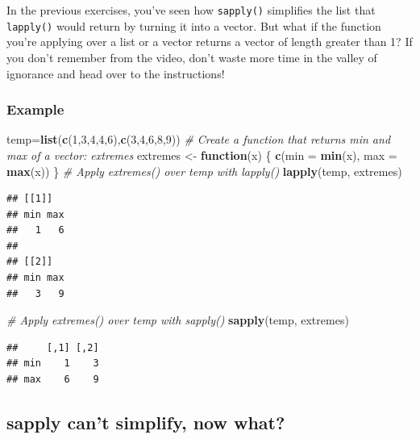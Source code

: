 \documentclass[
]{book}
\newenvironment{Shaded}{\begin{snugshade}}{\end{snugshade}}
\newcommand{\CommentTok}[1]{\textcolor[rgb]{0.56,0.35,0.01}{\textit{#1}}}
\newcommand{\ControlFlowTok}[1]{\textcolor[rgb]{0.13,0.29,0.53}{\textbf{#1}}}
\newcommand{\DataTypeTok}[1]{\textcolor[rgb]{0.13,0.29,0.53}{#1}}
\newcommand{\DecValTok}[1]{\textcolor[rgb]{0.00,0.00,0.81}{#1}}
\newcommand{\KeywordTok}[1]{\textcolor[rgb]{0.13,0.29,0.53}{\textbf{#1}}}
\newcommand{\NormalTok}[1]{#1}
\newcommand{\StringTok}[1]{\textcolor[rgb]{0.31,0.60,0.02}{#1}}
\begin{document}
In the previous exercises, you've seen how \texttt{sapply()} simplifies the list that \texttt{lapply()} would return by turning it into a vector. But what if the function you're applying over a list or a vector returns a vector of length greater than 1? If you don't remember from the video, don't waste more time in the valley of ignorance and head over to the instructions!

\hypertarget{example-4}{%
\subsubsection{Example}\label{example-4}}

\begin{Shaded}
\begin{Highlighting}[]
\NormalTok{temp=}\KeywordTok{list}\NormalTok{(}\KeywordTok{c}\NormalTok{(}\DecValTok{1}\NormalTok{,}\DecValTok{3}\NormalTok{,}\DecValTok{4}\NormalTok{,}\DecValTok{4}\NormalTok{,}\DecValTok{6}\NormalTok{),}\KeywordTok{c}\NormalTok{(}\DecValTok{3}\NormalTok{,}\DecValTok{4}\NormalTok{,}\DecValTok{6}\NormalTok{,}\DecValTok{8}\NormalTok{,}\DecValTok{9}\NormalTok{))}
\CommentTok{# Create a function that returns min and max of a vector: extremes}
\NormalTok{extremes <-}\StringTok{ }\ControlFlowTok{function}\NormalTok{(x) \{}
  \KeywordTok{c}\NormalTok{(}\DataTypeTok{min =} \KeywordTok{min}\NormalTok{(x), }\DataTypeTok{max =} \KeywordTok{max}\NormalTok{(x))}
\NormalTok{\}}
\CommentTok{# Apply extremes() over temp with lapply()}
\KeywordTok{lapply}\NormalTok{(temp, extremes)}
\end{Highlighting}
\end{Shaded}

\begin{verbatim}
## [[1]]
## min max 
##   1   6 
## 
## [[2]]
## min max 
##   3   9
\end{verbatim}

\begin{Shaded}
\begin{Highlighting}[]
\CommentTok{# Apply extremes() over temp with sapply()}
\KeywordTok{sapply}\NormalTok{(temp, extremes)}
\end{Highlighting}
\end{Shaded}

\begin{verbatim}
##     [,1] [,2]
## min    1    3
## max    6    9
\end{verbatim}

\hypertarget{sapply-cant-simplify-now-what}{%
\subsection{sapply can't simplify, now what?}\label{sapply-cant-simplify-now-what}}
\end{document}
